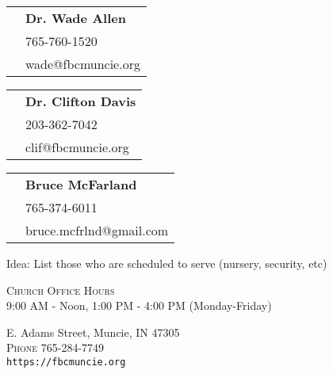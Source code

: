 \documentclass[
notumble,
nofoldmark,
letterpaper,
11pt,
]{leaflet}
\newcommand{\phone}[1]{\small{\faPhone \hspace{.2em} #1}}
\newcommand{\email}[1]{\small{\faEnvelopeO \hspace{.2em} #1}}
\newcommand{\pastor}[4]{
\begin{tabular}{r l}
\textsc{\multirow[t]{3}{8em}{#1}} & \textbf{#2} \\
 & \phone{#3} \\
 & \email{#4} \\
 \end{tabular}
 \newline
\vspace*{2mm}
\newline
}
\begin{document}
\vspace{5mm}



\pagebreak

\pastor{Pastor}{Dr. Wade Allen}{765-760-1520}{wade@fbcmuncie.org}
\pastor{Worship Arts Pastor}{Dr. Clifton Davis}{203-362-7042}{clif@fbcmuncie.org}
\pastor{Choir Director}{Bruce McFarland}{765-374-6011}{bruce.mcfrlnd@gmail.com}

Idea: List those who are scheduled to serve (nursery, security, etc)

\vfill


\centering
\textsc{Church Office Hours} \\
9:00 AM - Noon, 1:00 PM - 4:00 PM (Monday-Friday)

\medskip

 E. Adams Street, Muncie, IN 47305\\
\textsc{Phone} 765-284-7749\\
\texttt{https://fbcmuncie.org}

\loggingall
\end{document}
